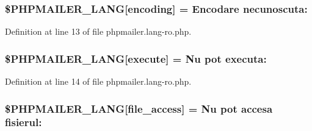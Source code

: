 \subsubsection[{\texorpdfstring{\$\+P\+H\+P\+M\+A\+I\+L\+E\+R\+\_\+\+L\+A\+NG}{$PHPMAILER_LANG}}]{\setlength{\rightskip}{0pt plus 5cm}\$P\+H\+P\+M\+A\+I\+L\+E\+R\+\_\+\+L\+A\+NG\mbox{[}\textquotesingle{}encoding\textquotesingle{}\mbox{]} = \textquotesingle{}Encodare necunoscuta\+: \textquotesingle{}}\hypertarget{phpmailer_8lang-ro_8php_a817f7283f3d54c970a0c10305cc668cc}{}\label{phpmailer_8lang-ro_8php_a817f7283f3d54c970a0c10305cc668cc}


Definition at line 13 of file phpmailer.\+lang-\/ro.\+php.

\subsubsection[{\texorpdfstring{\$\+P\+H\+P\+M\+A\+I\+L\+E\+R\+\_\+\+L\+A\+NG}{$PHPMAILER_LANG}}]{\setlength{\rightskip}{0pt plus 5cm}\$P\+H\+P\+M\+A\+I\+L\+E\+R\+\_\+\+L\+A\+NG\mbox{[}\textquotesingle{}execute\textquotesingle{}\mbox{]} = \textquotesingle{}Nu pot executa\+: \textquotesingle{}}\hypertarget{phpmailer_8lang-ro_8php_a668217a9563a168f30f2a8548b6ed5a9}{}\label{phpmailer_8lang-ro_8php_a668217a9563a168f30f2a8548b6ed5a9}


Definition at line 14 of file phpmailer.\+lang-\/ro.\+php.

\subsubsection[{\texorpdfstring{\$\+P\+H\+P\+M\+A\+I\+L\+E\+R\+\_\+\+L\+A\+NG}{$PHPMAILER_LANG}}]{\setlength{\rightskip}{0pt plus 5cm}\$P\+H\+P\+M\+A\+I\+L\+E\+R\+\_\+\+L\+A\+NG\mbox{[}\textquotesingle{}file\+\_\+access\textquotesingle{}\mbox{]} = \textquotesingle{}Nu pot accesa fisierul\+: \textquotesingle{}}\hypertarget{phpmailer_8lang-ro_8php_a7e83349023b856ef9e5c46e30ae6d51e}{}\label{phpmailer_8lang-ro_8php_a7e83349023b856ef9e5c46e30ae6d51e}


